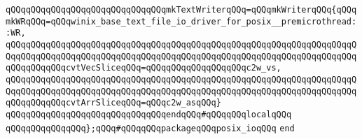 \newline
\verb|qQQqqQQqqQQqqQQqqQQqqQQqqQQqqQQqmkTextWriterqQQq=qQQqmkWriterqQQq{qQQqmkWRqQQq=qQQqwinix_base_text_file_io_driver_for_posix__premicrothread::WR,|\newline
\verb|qQQqqQQqqQQqqQQqqQQqqQQqqQQqqQQqqQQqqQQqqQQqqQQqqQQqqQQqqQQqqQQqqQQqqQQqqQQqqQQqqQQqqQQqqQQqqQQqqQQqqQQqqQQqqQQqqQQqqQQqqQQqqQQqqQQqqQQqqQQqqQQqqQQqqQQqcvtVecSliceqQQq=qQQqqQQqqQQqqQQqqQQqc2w_vs,|\newline
\verb|qQQqqQQqqQQqqQQqqQQqqQQqqQQqqQQqqQQqqQQqqQQqqQQqqQQqqQQqqQQqqQQqqQQqqQQqqQQqqQQqqQQqqQQqqQQqqQQqqQQqqQQqqQQqqQQqqQQqqQQqqQQqqQQqqQQqqQQqqQQqqQQqqQQqqQQqcvtArrSliceqQQq=qQQqc2w_asqQQq}|\newline
\newline
\verb|qQQqqQQqqQQqqQQqqQQqqQQqqQQqqQQqendqQQq#qQQqqQQqlocalqQQq|\newline
\newline
\verb|qQQqqQQqqQQqqQQq};qQQq#qQQqqQQqpackageqQQqposix_ioqQQq|\newline
\verb|end|\newline
\newline

